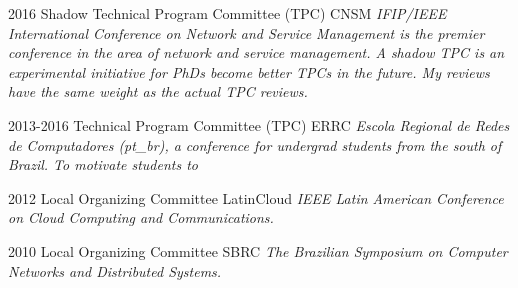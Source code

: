 \documentclass[print]{styles/friggeri-cv-mac} %
\begin{document}
\begin{entrylist}
\entry
{2016} 
{Shadow Technical Program Committee (TPC)}
{CNSM}
{\textit{IFIP/IEEE International Conference on Network and Service Management is
the premier conference in the area of network and service management. A shadow
TPC is an experimental initiative for PhDs become better TPCs in the future. My
reviews have the same weight as the actual TPC reviews.}}

\entry
{2013-2016} 
{Technical Program Committee (TPC)}
{ERRC}
{\textit{Escola Regional de Redes de Computadores (pt\_br), a conference for
undergrad students from the south of Brazil. To motivate students to }}

\entry
{2012} 
{Local Organizing Committee}
{LatinCloud}
{\textit{IEEE Latin American Conference on Cloud Computing and Communications.}}

\entry
{2010}
{Local Organizing Committee}
{SBRC}
{\textit{The Brazilian Symposium on Computer Networks and Distributed Systems.}}

\end{entrylist}



\end{document}
